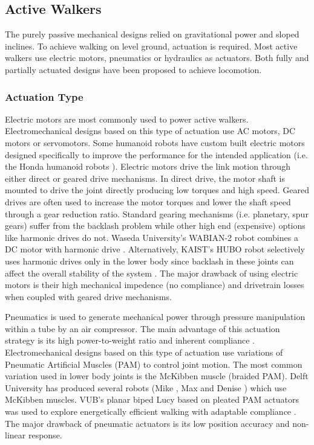 

\subsection{Active Walkers} %
\label{sub:related_active_designs}
The purely passive mechanical designs relied on gravitational power and sloped inclines. To achieve walking on level ground, actuation is required. Most active walkers use  electric motors, pneumatics or hydraulics as actuators. Both fully and partially actuated designs have been proposed to achieve locomotion. 

\subsubsection{Actuation Type} %
\label{ssub:actuation_type}

Electric motors are most commonly used to power active walkers. Electromechanical designs based on this type of actuation use AC motors, DC motors or servomotors. Some humanoid robots have custom built electric motors designed specifically to improve the performance for the intended application (i.e. the Honda humanoid robots \cite{Sakagami:2002cf,Hirai1998}). Electric motors drive the link motion through either direct or geared drive mechanisms. In direct drive, the motor shaft is mounted to drive the joint directly producing low torques and high speed. Geared drives are often used to increase the motor torques and lower the shaft speed through a gear reduction ratio. Standard gearing mechanisms (i.e. planetary, spur gears) suffer from the backlash problem while other high end (expensive) options like harmonic drives do not. Waseda University's WABIAN-2 robot combines a DC motor with harmonic drive \cite{Ogura:2006bm}. Alternatively, KAIST's HUBO robot selectively uses harmonic drives only in the lower body since backlash in these joints can affect the overall stability of the system \cite{IllWooPark:2005et}. The major drawback of using electric motors is their high mechanical impedence (no compliance) and drivetrain losses when coupled with geared drive mechanisms.  

Pneumatics is used to generate mechanical power through pressure manipulation within a tube by an air compressor. The main advantage of this actuation strategy is its high power-to-weight ratio and inherent compliance \cite{Wisse2007}. Electromechanical designs based on this type of actuation use variations of Pneumatic Artificial Muscles (PAM) to control joint motion. The most common variation used in lower body joints is the McKibben muscle (braided PAM). Delft University has produced several robots (Mike \cite{Wisse2003}, Max \cite{Hobbelen2005} and Denise \cite{Hobbelen2008,Wisse:2007wh}) which use McKibben muscles. VUB's planar biped Lucy based on pleated PAM actuators was used to explore energetically efficient walking with adaptable compliance \cite{Vanderborght:2005kq}. The major drawback of pneumatic actuators is its low position accuracy and non-linear response. 


